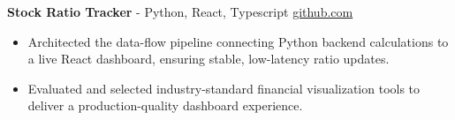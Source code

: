 \documentclass[11pt]{article}       %
\begin{document}

\textbf{Stock Ratio Tracker}{ - Python, React, Typescript} \hfill \href{https://github.com/Monica20030707/tradingDashboard-UI}{github.com} \\
\vspace{-9pt}
\begin{itemize}
  \item Architected the data-flow pipeline connecting Python backend calculations to a live React dashboard, ensuring stable, low-latency ratio updates. 
  \item Evaluated and selected industry-standard financial visualization tools to deliver a production-quality dashboard experience.
\end{itemize}
\end{document}
